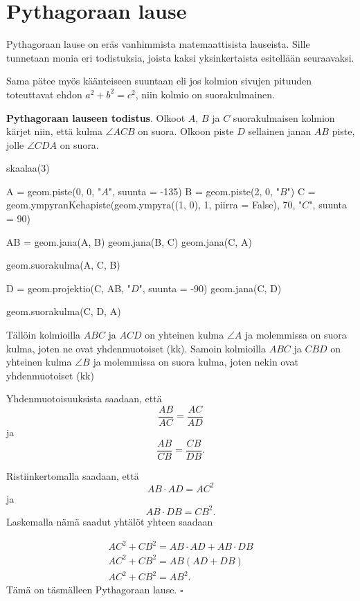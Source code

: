 \section{Pythagoraan lause}

Pythagoraan lause on eräs vanhimmista matemaattisista lauseista. Sille tunnetaan monia eri todistuksia, joista kaksi yksinkertaista esitellään seuraavaksi.


Sama pätee myös käänteiseen suuntaan eli jos kolmion sivujen pituuden toteuttavat ehdon $a^2 + b^2 = c^2$, niin kolmio on suorakulmainen.

\textbf{Pythagoraan lauseen todistus}. Olkoot $A$, $B$ ja $C$ suorakulmaisen kolmion kärjet niin, että kulma $\angle ACB$ on suora. Olkoon piste $D$ sellainen janan $AB$ piste, jolle $\angle CDA$ on suora.

\begin{kuva}
skaalaa(3)

A = geom.piste(0, 0, "$A$", suunta = -135)
B = geom.piste(2, 0, "$B$")
C = geom.ympyranKehapiste(geom.ympyra((1, 0), 1, piirra = False), 70, "$C$", suunta = 90)

AB = geom.jana(A, B)
geom.jana(B, C)
geom.jana(C, A)

geom.suorakulma(A, C, B)

D = geom.projektio(C, AB, "$D$", suunta = -90)
geom.jana(C, D)

geom.suorakulma(C, D, A)


\end{kuva}

Tällöin kolmioilla $ABC$ ja $ACD$ on yhteinen kulma $\angle A$ ja molemmissa on suora kulma, joten ne ovat yhdenmuotoiset (kk). Samoin kolmioilla $ABC$ ja $CBD$ on yhteinen kulma
$\angle B$ ja molemmissa on suora kulma, joten nekin ovat yhdenmuotoiset (kk)

Yhdenmuotoisuuksista saadaan, että
\[
\frac{AB}{AC} = \frac{AC}{AD}
\]
ja
\[
\frac{AB}{CB} = \frac{CB}{DB}.
\]

Ristiinkertomalla saadaan, että
\[
AB \cdot AD = AC^2
\]
ja
\[
AB \cdot DB = CB^2.
\]
Laskemalla nämä saadut yhtälöt yhteen saadaan

\begin{align*}
AC^2 + CB^2  = AB \cdot AD + AB \cdot DB \\
AC^2 + CB^2  = AB(AD + DB) \\
AC^2 + CB^2  = AB^2.
\end{align*}
Tämä on täsmälleen Pythagoraan lause. $\square $

